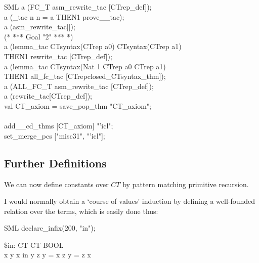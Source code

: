 {\begin{GFT}{SML}
\+a (FC\_T asm\_rewrite\_tac [CTrep\_def]);\\
\+a (\MMM{\epsilon}\_tac \PrKM{}\MMM{\epsilon} n\MMM{\bullet} n = a\PrKO{} THEN1 prove\_\MMM{\exists}\_tac);\\
\+a (asm\_rewrite\_tac[]);\\
\+(* *** Goal "2" *** *)\\
\+a (lemma\_tac \PrKM{}CTsyntax(CTrep a0) \MMM{\land} CTsyntax(CTrep a1)\PrKO{}\\
\+	THEN1 rewrite\_tac [CTrep\_def]);\\
\+a (lemma\_tac \PrKM{}CTsyntax(Nat 1 \MMM{\mapsto} CTrep a0 \MMM{\mapsto} CTrep a1)\PrKO{}\\
\+	THEN1 all\_fc\_tac [CTrepclosed\_CTsyntax\_thm]);\\
\+a (ALL\_FC\_T asm\_rewrite\_tac [CTrep\_def]);\\
\+a (rewrite\_tac[CTrep\_def]);\\
\+val CT\_axiom = save\_pop\_thm "CT\_axiom";\\
\+\\
\+add\_\MMM{\exists}\_cd\_thms [CT\_axiom] "'icl";\\
\+set\_merge\_pcs ["misc31", "'icl"];\\
\end{GFT}
}%

\subsection{Further Definitions}

We can now define constants over $CT$ by pattern matching primitive recursion.

I would normally obtain a `course of values' induction by defining a well-founded relation over the terms, which is easily done thus:

\begin{GFT}{SML}
\+declare\_infix(200, "in");\\
\end{GFT}

\begin{HOLConst}
\+\PrNM{} \$\PrNL{}in\PrNN{}: CT \MMM{\rightarrow} CT \MMM{\rightarrow} BOOL\\
\PrPH{}\PrPM{}\PrPM{}\PrPM{}\PrPM{}\PrPM{}\PrPM{}\PrPM{}\PrPM{}\PrPM{}\PrPM{}\PrPM{}
\+\PrNM{} \MMM{\forall}x y\MMM{\bullet} x in y \MMM{\Leftrightarrow} \MMM{\exists}z\MMM{\bullet} y = x  z \MMM{\lor} y = z  x\\
\end{HOLConst}


